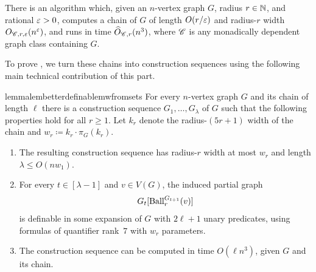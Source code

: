 \begin{theorem}\label{thm:monadic-dependence-implies-definable-mw}  
  There is an algorithm which, given 
  an $n$-vertex graph $G$, radius $r\in\mathbb N$, and rational $\varepsilon>0$, computes a chain of $G$ of length $O(r/\varepsilon)$ and radius-$r$ width $O_{\mathscr C,r,\varepsilon}(n^\varepsilon)$, 
  and runs in time  $\widehat O_{\mathscr C,r}(n^{3})$, 
  where $\mathscr C$ is any monadically dependent graph class containing $G$.
\end{theorem}

To prove , we turn these chains into construction sequences using the following main technical contribution of this part.

\begin{restatable}{lemma}{lembetterdefinablemwfromsets}\label{lem:better-definable-mw-from-sets}
  For every $n$-vertex graph $G$ and its chain of length $\ell$ there is
  a construction sequence $G_1,\ldots,G_\lambda$ of $G$ such that the following properties hold for all $r\ge 1$.
  Let $k_r$ denote the radius-$(5r+1)$ width of the chain and $w_r \coloneqq k_r\cdot \pi_G(k_r)$.
  \begin{enumerate}
    \item The resulting construction sequence has radius-$r$ width at most $w_r$ and length $\lambda\le O(nw_1)$.
    \item For every $t\in[\lambda-1]$ and $v\in V(G)$, the induced partial graph
    \[
        G_t[\operatorname{Ball}^{G_{t+1}}_r(v)]
    \]
    is definable in some expansion of $G$
    with $2\ell+1$ unary predicates, using formulas of quantifier rank~$7$ with $w_r$ parameters.
    \item The construction sequence can be computed in time $O(\ell n^3)$, given $G$ and its chain.
  \end{enumerate}
\end{restatable}


